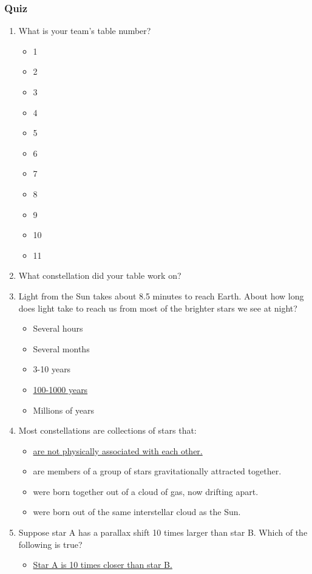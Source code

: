 \documentclass[12pt]{article}
\begin{document}
\subsubsection{Quiz}
\begin{enumerate}
\item
What is your team's table number?
\begin{itemize}
    \item 1
    \item 2
    \item 3
    \item 4
    \item 5
    \item 6
    \item 7
    \item 8
    \item 9
    \item 10
    \item 11
\end{itemize}
\item
What constellation did your table work on?
\item
Light from the Sun takes about 8.5 minutes to reach Earth. About how long does light take to reach us from most of the brighter stars we see at night?
\begin{itemize}
    \item Several hours
    \item Several months
    \item 3-10 years
    \item \underline{100-1000 years}
    \item Millions of years
\end{itemize}
\item
Most constellations are collections of stars that:
\begin{itemize}
    \item \underline{are not physically associated with each other.}
    \item are members of a group of stars gravitationally attracted together.
    \item were born together out of a cloud of gas, now drifting apart.
    \item were born out of the same interstellar cloud as the Sun.
\end{itemize}
\item
Suppose star A has a parallax shift 10 times larger than star B. Which of the following is true?
\begin{itemize}
    \item \underline{Star A is 10 times closer than star B.}

\end{itemize}
\end{enumerate}
\end{document}
